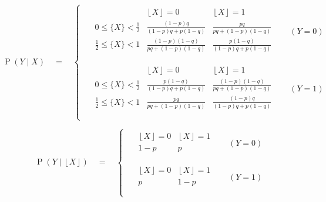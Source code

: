 \documentclass[12pt]{article}
\newcommand{\Prob}[1]{\operatorname{P}\left(#1\right)}
\newcommand{\floor}[1]{\left\lfloor #1 \right\rfloor}
\theoremstyle{definition}
\numberwithin{equation}{section}
\numberwithin{figure}{section}
\numberwithin{table}{section}
\begin{document}
\begin{equation*}
    \Prob{Y\mid X} \,\,\,\,\,\, = \,\,\,\,\,\,
    \begin{cases}
        \,\,\,\,\,\, 
        \begin{array}{l|rr}
             & \floor{X}=0 & \floor{X}=1 \\
             \hline
             0 \le \{X\} < \frac12 & 
             \frac{(1-p)q}{(1-p)q+p(1-q)} & 
             \frac{pq}{pq+(1-p)(1-q)} \\
             \frac12 \le \{X\} < 1 & 
             \frac{(1-p)(1-q)}{pq+(1-p)(1-q)} & 
             \frac{p(1-q)}{(1-p)q+p(1-q)}  \\
        \end{array}
        & \,\,\,\,\,\, (Y = 0) \\
        & \\
        \,\,\,\,\,\, 
        \begin{array}{l|rr}
             & \floor{X}=0 & \floor{X}=1 \\
             \hline
             0 \le \{X\} < \frac12 & 
             \frac{p(1-q)}{(1-p)q+p(1-q)} & 
             \frac{(1-p)(1-q)}{pq+(1-p)(1-q)} \\
             \frac12 \le \{X\} < 1 & 
             \frac{pq}{pq+(1-p)(1-q)} & 
             \frac{(1-p)q}{(1-p)q+p(1-q)}  \\
        \end{array}
        & \,\,\,\,\,\, (Y = 1) \\
    \end{cases}
\end{equation*}

\begin{equation*}
    \Prob{Y\mid \floor{X}} \,\,\,\,\,\, = \,\,\,\,\,\,
    \begin{cases}
        \,\,\,\,\,\, 
        \begin{array}{cc}
             \floor{X}=0 & \floor{X}=1 \\
             \hline
             1-p & p \\
        \end{array}
        & \,\,\,\,\,\, (Y = 0) \\
        & \\
        \,\,\,\,\,\, 
        \begin{array}{cc}
             \floor{X}=0 & \floor{X}=1 \\
             \hline
             p & 1-p \\
        \end{array}
        & \,\,\,\,\,\, (Y = 1) \\
    \end{cases}
\end{equation*}
\end{document}
